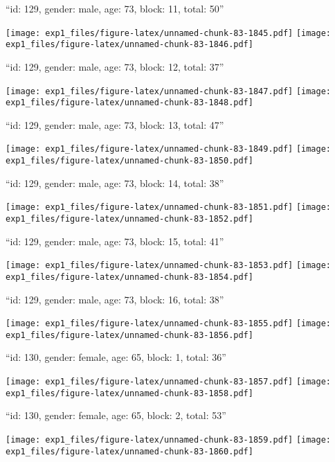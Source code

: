 \documentclass[11pt,,]{article}
\begin{document}
\newpage
[1] 

``id: 129, gender: male, age: 73, block: 11, total: 50''

\texttt{[image: exp1\_files/figure-latex/unnamed-chunk-83-1845.pdf]}
\texttt{[image: exp1\_files/figure-latex/unnamed-chunk-83-1846.pdf]}

\newpage
[1] 

``id: 129, gender: male, age: 73, block: 12, total: 37''

\texttt{[image: exp1\_files/figure-latex/unnamed-chunk-83-1847.pdf]}
\texttt{[image: exp1\_files/figure-latex/unnamed-chunk-83-1848.pdf]}

\newpage
[1] 

``id: 129, gender: male, age: 73, block: 13, total: 47''

\texttt{[image: exp1\_files/figure-latex/unnamed-chunk-83-1849.pdf]}
\texttt{[image: exp1\_files/figure-latex/unnamed-chunk-83-1850.pdf]}

\newpage
[1] 

``id: 129, gender: male, age: 73, block: 14, total: 38''

\texttt{[image: exp1\_files/figure-latex/unnamed-chunk-83-1851.pdf]}
\texttt{[image: exp1\_files/figure-latex/unnamed-chunk-83-1852.pdf]}

\newpage
[1] 

``id: 129, gender: male, age: 73, block: 15, total: 41''

\texttt{[image: exp1\_files/figure-latex/unnamed-chunk-83-1853.pdf]}
\texttt{[image: exp1\_files/figure-latex/unnamed-chunk-83-1854.pdf]}

\newpage
[1] 

``id: 129, gender: male, age: 73, block: 16, total: 38''

\texttt{[image: exp1\_files/figure-latex/unnamed-chunk-83-1855.pdf]}
\texttt{[image: exp1\_files/figure-latex/unnamed-chunk-83-1856.pdf]}

\newpage
[1] 

``id: 130, gender: female, age: 65, block: 1, total: 36''

\texttt{[image: exp1\_files/figure-latex/unnamed-chunk-83-1857.pdf]}
\texttt{[image: exp1\_files/figure-latex/unnamed-chunk-83-1858.pdf]}

\newpage
[1] 

``id: 130, gender: female, age: 65, block: 2, total: 53''

\texttt{[image: exp1\_files/figure-latex/unnamed-chunk-83-1859.pdf]}
\texttt{[image: exp1\_files/figure-latex/unnamed-chunk-83-1860.pdf]}
\end{document}
